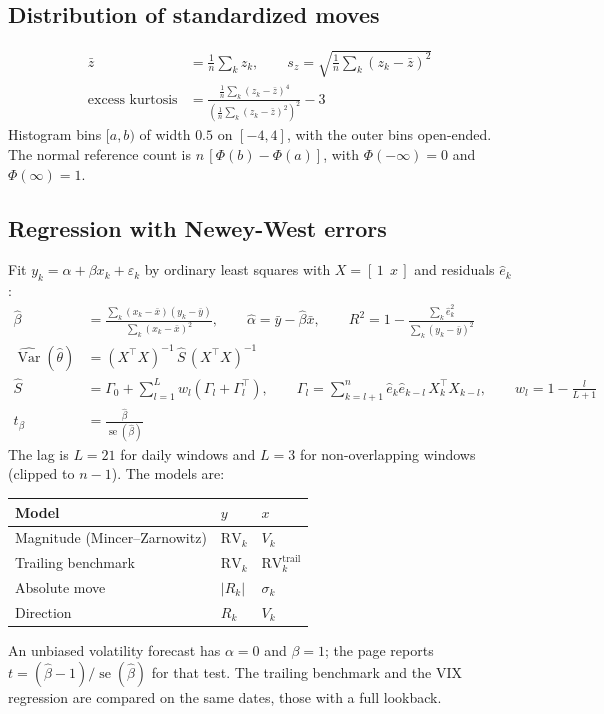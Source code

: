 \documentclass[11pt]{article}
\begin{document}
\subsection*{Distribution of standardized moves}
\begin{align*}
\bar z &= \frac1n\sum_k z_k, \qquad s_z = \sqrt{\frac1n\sum_k (z_k - \bar z)^2}\\
\text{excess kurtosis} &= \frac{\frac1n\sum_k (z_k - \bar z)^4}{\left(\frac1n\sum_k (z_k - \bar z)^2\right)^{2}} - 3
\end{align*}
Histogram bins $[a, b)$ of width $0.5$ on $[-4, 4]$, with the outer bins open-ended. The normal reference count is $n\,[\Phi(b) - \Phi(a)]$, with $\Phi(-\infty)=0$ and $\Phi(\infty)=1$.

\subsection*{Regression with Newey-West errors}
Fit $y_k = \alpha + \beta x_k + \varepsilon_k$ by ordinary least squares with $X = [\,1\ \ x\,]$ and residuals $\hat e_k$:
\begin{align*}
\hat\beta &= \frac{\sum_k (x_k - \bar x)(y_k - \bar y)}{\sum_k (x_k - \bar x)^2}, \qquad \hat\alpha = \bar y - \hat\beta \bar x, \qquad
R^2 = 1 - \frac{\sum_k \hat e_k^2}{\sum_k (y_k - \bar y)^2}\\
\widehat{\operatorname{Var}}(\hat\theta) &= (X^\top X)^{-1}\, \hat S\, (X^\top X)^{-1}\\
\hat S &= \Gamma_0 + \sum_{l=1}^{L} w_l\left(\Gamma_l + \Gamma_l^\top\right), \qquad
\Gamma_l = \sum_{k=l+1}^{n} \hat e_k \hat e_{k-l}\, X_k^\top X_{k-l}, \qquad w_l = 1 - \frac{l}{L+1}\\
t_\beta &= \frac{\hat\beta}{\operatorname{se}(\hat\beta)}
\end{align*}
The lag is $L = 21$ for daily windows and $L = 3$ for non-overlapping windows (clipped to $n-1$). The models are:
\begin{center}
\begin{tabular}{@{}lll@{}}
\toprule
Model & $y$ & $x$\\
\midrule
Magnitude (Mincer--Zarnowitz) & $\mathrm{RV}_k$ & $V_k$\\
Trailing benchmark & $\mathrm{RV}_k$ & $\mathrm{RV}^{\mathrm{trail}}_k$\\
Absolute move & $|R_k|$ & $\sigma_k$\\
Direction & $R_k$ & $V_k$\\
\bottomrule
\end{tabular}
\end{center}
An unbiased volatility forecast has $\alpha = 0$ and $\beta = 1$; the page reports $t = (\hat\beta - 1)/\operatorname{se}(\hat\beta)$ for that test. The trailing benchmark and the VIX regression are compared on the same dates, those with a full lookback.
\end{document}
